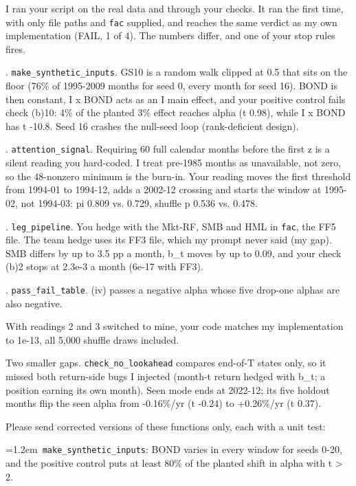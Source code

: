 \par\noindent I ran your script on the real data and through your checks. It ran the first time, with only file paths and \texttt{fac} supplied, and reaches the same verdict as my own implementation (FAIL, 1 of 4). The numbers differ, and one of your stop rules fires.
\medskip
\par{}. \texttt{make\_synthetic\_inputs}. GS10 is a random walk clipped at 0.5 that sits on the floor (76\% of 1995-2009 months for seed 0, every month for seed 16). BOND is then constant, I x BOND acts as an I main effect, and your positive control fails check (b)10: 4\% of the planted 3\% effect reaches alpha (t 0.98), while I x BOND has t -10.8. Seed 16 crashes the null-seed loop (rank-deficient design).
\medskip
\par{}. \texttt{attention\_signal}. Requiring 60 full calendar months before the first z is a silent reading you hard-coded. I treat pre-1985 months as unavailable, not zero, so the 48-nonzero minimum is the burn-in. Your reading moves the first threshold from 1994-01 to 1994-12, adds a 2002-12 crossing and starts the window at 1995-02, not 1994-03: pi 0.809 vs. 0.729, shuffle p 0.536 vs. 0.478.
\medskip
\par{}. \texttt{leg\_pipeline}. You hedge with the Mkt-RF, SMB and HML in \texttt{fac}, the FF5 file. The team hedge uses its FF3 file, which my prompt never said (my gap). SMB differs by up to 3.5 pp a month, b\_t moves by up to 0.09, and your check (b)2 stops at 2.3e-3 a month (6e-17 with FF3).
\medskip
\par{}. \texttt{pass\_fail\_table}. (iv) passes a negative alpha whose five drop-one alphas are also negative.
\medskip
\par\noindent With readings 2 and 3 switched to mine, your code matches my implementation to 1e-13, all 5,000 shuffle draws included.
\medskip
\par\noindent Two smaller gaps. \texttt{check\_no\_lookahead} compares end-of-T states only, so it missed both return-side bugs I injected (month-t return hedged with b\_t; a position earning its own month). Seen mode ends at 2022-12; its five holdout months flip the seen alpha from -0.16\%/yr (t -0.24) to +0.26\%/yr (t 0.37).
\medskip
\par\noindent Please send corrected versions of these functions only, each with a unit test:
\par\hangindent=1.2em\noindent\textbullet~\texttt{make\_synthetic\_inputs}: BOND varies in every window for seeds 0-20, and the positive control puts at least 80\% of the planted shift in alpha with t \textgreater{} 2.
